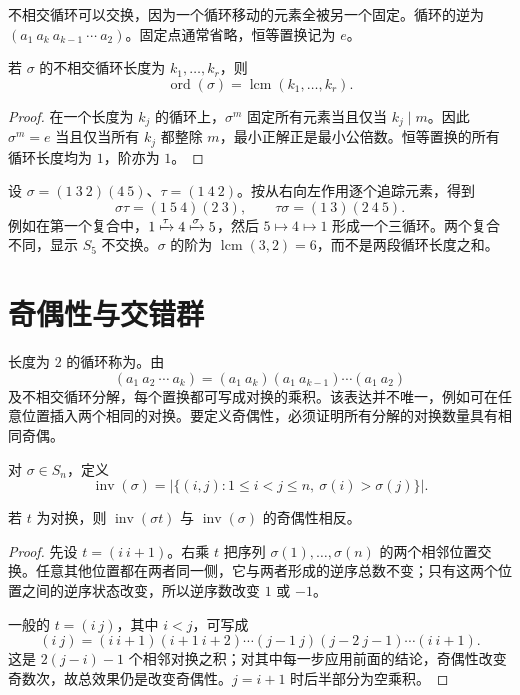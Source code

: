 \documentclass[UTF8,12pt,a4paper,fontset=fandol]{ctexbook}
\begin{document}
不相交循环可以交换，因为一个循环移动的元素全被另一个固定。循环的逆为 $(a_1\ a_k\ a_{k-1}\ \cdots\ a_2)$。固定点通常省略，恒等置换记为 $e$。

\begin{proposition}[置换的阶]\label{prop:permutation-order}
若 $\sigma$ 的不相交循环长度为 $k_1,\ldots,k_r$，则
\[
  \operatorname{ord}(\sigma)=\operatorname{lcm}(k_1,\ldots,k_r).
\]
\end{proposition}
\begin{proof}
在一个长度为 $k_j$ 的循环上，$\sigma^m$ 固定所有元素当且仅当 $k_j\mid m$。因此 $\sigma^m=e$ 当且仅当所有 $k_j$ 都整除 $m$，最小正解正是最小公倍数。恒等置换的所有循环长度均为 $1$，阶亦为 $1$。
\end{proof}

\begin{example}[复合与元素阶]\label{ex:permutation-products}
设 $\sigma=(1\ 3\ 2)(4\ 5)$、$\tau=(1\ 4\ 2)$。按从右向左作用逐个追踪元素，得到
\[
  \sigma\tau=(1\ 5\ 4)(2\ 3),\qquad
  \tau\sigma=(1\ 3)(2\ 4\ 5).
\]
例如在第一个复合中，$1\xmapsto{\tau}4\xmapsto{\sigma}5$，然后 $5\mapsto4\mapsto1$ 形成一个三循环。两个复合不同，显示 $S_5$ 不交换。$\sigma$ 的阶为 $\operatorname{lcm}(3,2)=6$，而不是两段循环长度之和。
\end{example}

\section{奇偶性与交错群}\label{sec:permutation-sign}

长度为 $2$ 的循环称为。由
\begin{equation}\label{eq:cycle-transpositions}
  (a_1\ a_2\ \cdots\ a_k)
  =(a_1\ a_k)(a_1\ a_{k-1})\cdots(a_1\ a_2)
\end{equation}
及不相交循环分解，每个置换都可写成对换的乘积。该表达并不唯一，例如可在任意位置插入两个相同的对换。要定义奇偶性，必须证明所有分解的对换数量具有相同奇偶。

对 $\sigma\in S_n$，定义
\[
  \operatorname{inv}(\sigma)
  =\bigl|\{(i,j):1\leq i<j\leq n,\ \sigma(i)>\sigma(j)\}\bigr|.
\]

\begin{lemma}[对换改变逆序数的奇偶性]\label{lem:transposition-parity}
若 $t$ 为对换，则 $\operatorname{inv}(\sigma t)$ 与 $\operatorname{inv}(\sigma)$ 的奇偶性相反。
\end{lemma}
\begin{proof}
先设 $t=(i\ i+1)$。右乘 $t$ 把序列 $\sigma(1),\ldots,\sigma(n)$ 的两个相邻位置交换。任意其他位置都在两者同一侧，它与两者形成的逆序总数不变；只有这两个位置之间的逆序状态改变，所以逆序数改变 $1$ 或 $-1$。

一般的 $t=(i\ j)$，其中 $i<j$，可写成
\[
  (i\ j)=(i\ i+1)(i+1\ i+2)\cdots(j-1\ j)
  (j-2\ j-1)\cdots(i\ i+1).
\]
这是 $2(j-i)-1$ 个相邻对换之积；对其中每一步应用前面的结论，奇偶性改变奇数次，故总效果仍是改变奇偶性。$j=i+1$ 时后半部分为空乘积。
\end{proof}
\end{document}
